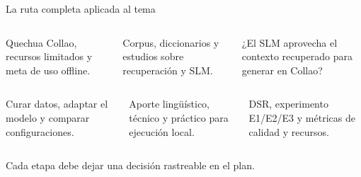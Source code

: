 \documentclass[aspectratio=169,10pt,spanish]{beamer}
\begin{document}
\begin{frame}{La ruta completa aplicada al tema}
\small
\begin{columns}[T,onlytextwidth]
\begin{tcolorbox}[colback=bpLightGray,colframe=bpRust,title={1. Contexto}]
Quechua Collao, recursos limitados y meta de uso offline.
\end{tcolorbox}
\begin{tcolorbox}[colback=bpLightGray,colframe=bpBlue,title={2. Evidencia}]
Corpus, diccionarios y estudios sobre recuperación y SLM.
\end{tcolorbox}
\begin{tcolorbox}[colback=bpLightGray,colframe=bpRust,title={3. Problema}]
¿El SLM aprovecha el contexto recuperado para generar en Collao?
\end{tcolorbox}
\end{columns}
\vspace{0.28cm}
\begin{columns}[T,onlytextwidth]
\begin{tcolorbox}[colback=bpLightGray,colframe=bpBlue,title={4. Objetivos}]
Curar datos, adaptar el modelo y comparar configuraciones.
\end{tcolorbox}
\begin{tcolorbox}[colback=bpLightGray,colframe=bpGold,title={5. Justificación}]
Aporte lingüístico, técnico y práctico para ejecución local.
\end{tcolorbox}
\begin{tcolorbox}[colback=bpLightGray,colframe=bpGold,title={6. Método}]
DSR, experimento E1/E2/E3 y métricas de calidad y recursos.
\end{tcolorbox}
\end{columns}
\vspace{0.18cm}
\centering\scriptsize Cada etapa debe dejar una decisión rastreable en el plan.
\end{frame}
\end{document}
